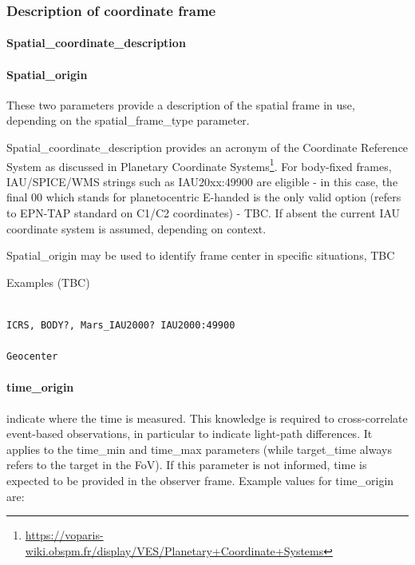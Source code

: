 \documentclass[11pt,a4paper]{ivoa}
\begin{document}
\subsubsection{Description of coordinate frame}

\paragraph{Spatial\_coordinate\_description}

\paragraph{Spatial\_origin}

These two parameters provide a description of the spatial frame in use, depending on the spatial\_frame\_type parameter. 

Spatial\_coordinate\_description provides an acronym of the Coordinate Reference System as discussed in Planetary Coordinate Systems\footnote{\url{https://voparis-wiki.obspm.fr/display/VES/Planetary+Coordinate+Systems}}. For body-fixed frames, IAU/SPICE/WMS strings such as IAU20xx:49900 are eligible - in this case, the final 00 which stands for planetocentric E-handed is the only valid option (refers to EPN-TAP standard on C1/C2 coordinates) - TBC. If absent the current IAU coordinate system is assumed, depending on context. 

Spatial\_origin may be used to identify frame center in specific situations, TBC

Examples (TBC)

\begin{verbatim}

ICRS, BODY?, Mars_IAU2000? IAU2000:49900

Geocenter

\end{verbatim}

\paragraph{time\_origin}

indicate where the time is measured. This knowledge is required to cross-correlate event-based observations, in particular to indicate light-path differences. It applies to the time\_min and time\_max parameters (while target\_time always refers to the target in the FoV). If this parameter is not informed, time is expected to be provided in the observer frame. Example values for time\_origin are:
\end{document}
